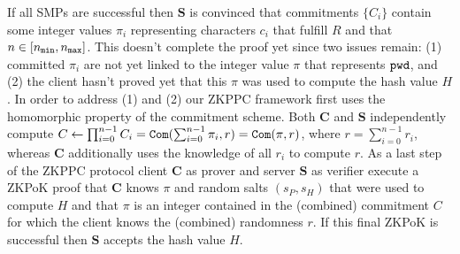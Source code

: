If all SMPs are successful then $\bm{S}$ is convinced that commitments $\{C_i\}$ contain some integer values $\pi_i$ representing characters $c_i$ that fulfill $R$ and that $n\in[{n_\mathtt{min}},{n_\mathtt{max}}]$. This doesn't complete the proof yet since two issues remain:  (1) committed $\pi_i$ are not yet linked to the integer value $\pi$ that represents $\mathtt{pwd}$, and (2) the client hasn't proved yet that this $\pi$ was used to compute the hash value $H$. In order to address (1) and (2) our ZKPPC framework first uses the homomorphic property of the commitment scheme. Both $\bm{C}$ and $\bm{S}$ independently compute $C\gets\prod_{i=0}^{n-1}C_i=\mathtt{Com}(\sum_{i=0}^{n-1} \pi_i,r)= \mathtt{Com}(\pi, r)$, where $r = \sum_{i=0}^{n-1} r_i$, whereas $\bm{C}$ additionally uses the knowledge of all $r_i$ to compute $r$. As a last step of the ZKPPC protocol client $\bm{C}$ as prover and server $\bm{S}$ as verifier execute a ZKPoK proof that $\bm{C}$ knows $\pi$ and random salts $(s_P, s_H)$ that were used to compute $H$ and that $\pi$ is an integer contained in the (combined) commitment $C$ for which the client knows the (combined) randomness $r$. If this final ZKPoK is successful then $\bm{S}$ accepts the hash value $H$.



